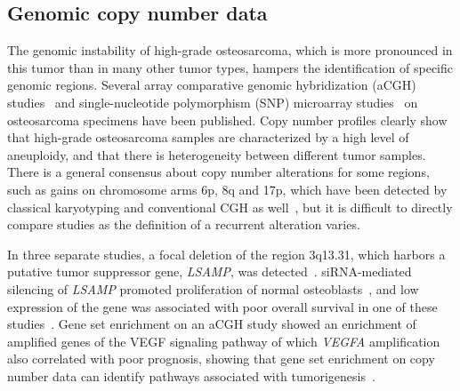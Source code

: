 \subsection{Genomic copy number data}
The genomic instability of high\hyp{}grade osteosarcoma, which is
more pronounced in this tumor than in many other tumor
types, hampers the identification of specific genomic regions.
Several array comparative genomic hybridization (aCGH)
studies~\cite{kresse2011preclinical,squire2003high,man2004genome,atiye2005gene,yang2011genetic,kresse2009lsamp,lockwood2011cyclin} and single\hyp{}nucleotide polymorphism (SNP)
microarray studies~\cite{kuijjer2012identification,yen2009identification,kresse2010evaluation,smida2010genomic,pasic2010recurrent} on osteosarcoma specimens have
been published. Copy number profiles clearly show that
high\hyp{}grade osteosarcoma samples are characterized by a high
level of aneuploidy, and that there is heterogeneity between
different tumor samples. There is a general consensus about
copy number alterations for some regions, such as gains on
chromosome arms 6p, 8q and 17p, which have been detected
by classical karyotyping and conventional CGH as well~\cite{raymond2002conventional,lau2003frequent},
but it is difficult to directly compare studies as the definition
of a recurrent alteration varies.

In three separate studies, a focal deletion of the region
3q13.31, which harbors a putative tumor suppressor gene,
{\it LSAMP}, was detected~\cite{kresse2009lsamp,yen2009identification,pasic2010recurrent}. siRNA\hyp{}mediated silencing of
{\it LSAMP} promoted proliferation of normal osteoblasts~\cite{pasic2010recurrent}, and
low expression of the gene was associated with poor overall
survival in one of these studies~\cite{kresse2009lsamp}. Gene set enrichment on an
aCGH study showed an enrichment of amplified genes of the
VEGF signaling pathway of which {\it VEGFA} amplification also
correlated with poor prognosis, showing that gene set enrichment
on copy number data can identify pathways associated
with tumorigenesis~\cite{yang2011genetic}.

